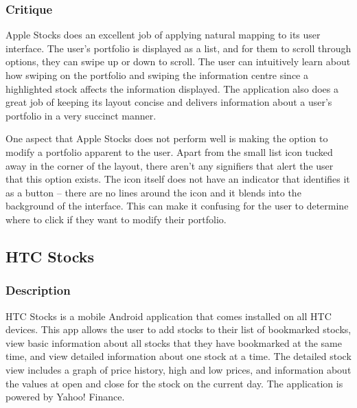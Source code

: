 \documentclass{sigchi}
\begin{document}
\subsubsection{Critique}
Apple Stocks does an excellent job of applying natural mapping to its user interface. The user's portfolio is displayed as a list, and for them to scroll through options, they can swipe up or down to scroll. The user can intuitively learn about how swiping on the portfolio and swiping the information centre since a highlighted stock affects the information displayed. The application also does a great job of keeping its layout concise and delivers information about a user's portfolio in a very succinct manner. \par
One aspect that Apple Stocks does not perform well is making the option to modify a portfolio apparent to the user. Apart from the small list icon tucked away in the corner of the layout, there aren't any signifiers that alert the user that this option exists. The icon itself does not have an indicator that identifies it as a button – there are no lines around the icon and it blends into the background of the interface. This can make it confusing for the user to determine where to click if they want to modify their portfolio.



\subsection{HTC Stocks}
\subsubsection{Description}
HTC Stocks is a mobile Android application that comes installed on all HTC devices. This app allows the user to add stocks to their list of bookmarked stocks, view basic information about all stocks that they have bookmarked at the same time, and view detailed information about one stock at a time.  The detailed stock view includes a graph of price history, high and low prices, and information about the values at open and close for the stock on the current day. The application is powered by Yahoo! Finance.

\end{document}
